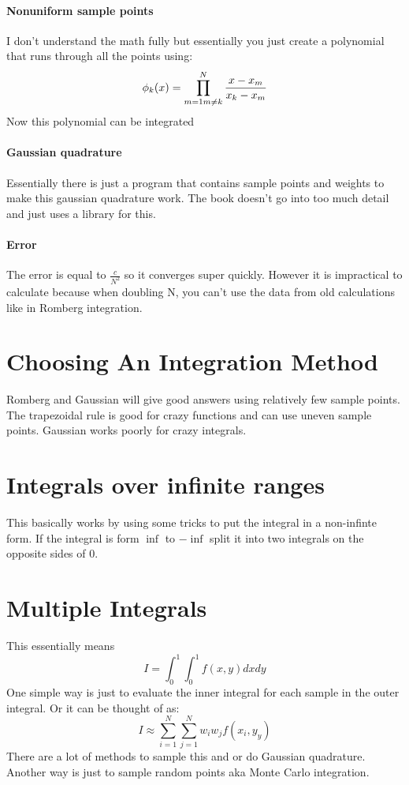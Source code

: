 \documentclass{report}
\begin{document}
\paragraph{Nonuniform sample points}
I don't understand the math fully but essentially you just create a polynomial that runs through all the points using:
\[\phi_k(x)=\prod_{m=1\linebreak m\ne k}^{N} \frac{x-x_m}{x_k-x_m}\]
Now this polynomial can be integrated
\paragraph{Gaussian quadrature}
Essentially there is just a program that contains sample points and weights to make this gaussian quadrature work. The book doesn't go into too much detail and just uses a library for this.
\paragraph{Error} The error is equal to $\frac c{N^2}$ so it converges super quickly. However it is impractical to calculate because when doubling N, you can't use the data from old calculations like in Romberg integration.
\section{Choosing An Integration Method}
Romberg and Gaussian will give good answers using relatively few sample points. The trapezoidal rule is good for crazy functions and can use uneven sample points. Gaussian works poorly for crazy integrals.
\section{Integrals over infinite ranges}
This basically works by using some tricks to put the integral in a non-infinte form. If the integral is form $\inf$ to $-\inf$ split it into two integrals on the opposite sides of 0.
\section {Multiple Integrals}
This essentially means
\[I=\int_0^1\int_0^1f(x,y)dx dy\]
One simple way is just to evaluate the inner integral for each sample in the outer integral. Or it can be thought of as:
\[I\approx\sum_{i=1}^N\sum_{j=1}^Nw_iw_jf(x_i,y_y)\]
There are a lot of methods to sample this and or do Gaussian quadrature. Another way is just to sample random points aka Monte Carlo integration.
\end{document}

